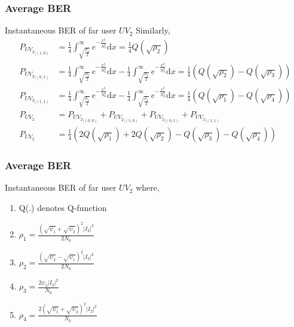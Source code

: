 \documentclass{beamer}
\providecommand{\brak}[1]{\ensuremath{\left(#1\right)}}
\begin{document}
\begin{frame}
\frametitle{Average BER}
\begin{block}{Instantaneous BER of far user $UV_2$}
Similarly,
\begin{align}
P_{{UV_2}_{|(1,0)}} &=  \frac{1}{4} \int_{\sqrt{\frac{{\rho_2}}{2}}}^\infty e^{-\frac{x^2}{N_0^2}} \mathrm{d}x  =  \frac{1}{4} Q(\sqrt{\rho_2})\\
P_{{UV_2}_{|(0,1)}} &= \frac{1}{4}  \int_{\sqrt{\frac{{\rho_2}}{2}}}^\infty e^{-\frac{x^2}{N_0^2}} \mathrm{d}x - \frac{1}{4} \int_{\sqrt{\frac{{\rho_3}}{2}}}^\infty e^{-\frac{x^2}{N_0^2}} \mathrm{d}x = \frac{1}{4} \brak{ Q(\sqrt{\rho_2})-Q(\sqrt{\rho_3})} \\
P_{{UV_2}_{|(1,1)}} &=  \frac{1}{4} \int_{\sqrt{\frac{{\rho_1}}{2}}}^\infty e^{-\frac{x^2}{N_0^2}} \mathrm{d}x - \frac{1}{4} \int_{\sqrt{\frac{{\rho_4}}{2}}}^\infty e^{-\frac{x^2}{N_0^2}} \mathrm{d}x =  \frac{1}{4} \brak{Q(\sqrt{\rho_1})-Q(\sqrt{\rho_4})}\\
P_{UV_2} &= P_{{UV_2}_{|(0,0)}}+ P_{{UV_2}_{|(1,0)}} + P_{{UV_2}_{|(0,1)}}+P_{{UV_2}_{|(1,1)}}\\
P_{UV_2} &= \frac{1}{4} \brak{2Q(\sqrt{\rho_1})+2Q(\sqrt{\rho_2})-Q(\sqrt{\rho_3})-Q(\sqrt{\rho_4})} \label{puv2}
\end{align}
\end{block}
\end{frame}


\begin{frame}
\frametitle{Average BER}
\begin{block}{Instantaneous BER of far user $UV_2$}
where,
\begin{enumerate}
\item  Q(.) denotes Q-function
\item  $\rho_1= \frac{(\sqrt{\psi_1}+\sqrt{\psi_2})^2|I_2|^2}{2N_0}$
\item  $\rho_2= \frac{(\sqrt{\psi_2}-\sqrt{\psi_1})^2|I_2|^2}{2N_0}$
\item  $\rho_3= \frac{2\psi_2|I_2|^2}{N_0}$
\item  $\rho_4= \frac{2(\sqrt{\psi_1}+\sqrt{\psi_2})^2|I_2|^2}{N_0}$
\end{enumerate}
\end{block}
\end{frame}
\end{document}
